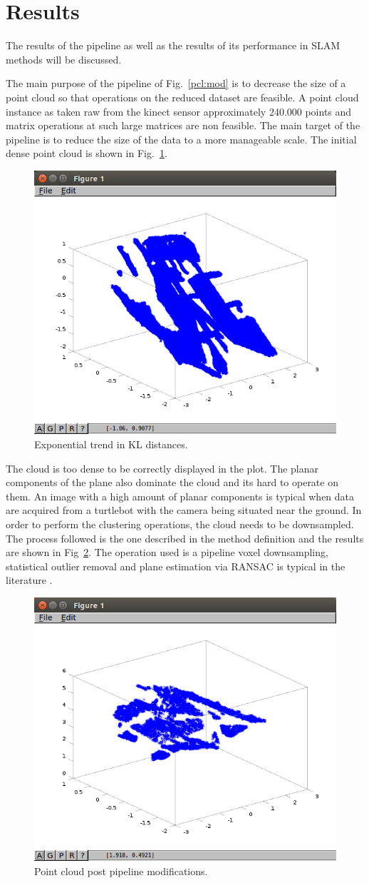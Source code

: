 \documentclass[twoside,hidelinks]{article}
\begin{document}
\section{Results}
\label{sec:results}

The results of the pipeline as well as the results of its performance in SLAM methods will be discussed.

The main purpose of the pipeline of Fig.~\ref{pcl:mod} is to decrease the size of a point cloud so that operations on the reduced dataset are feasible. A point cloud instance as taken raw from the kinect sensor approximately 240.000 points and matrix operations at such large matrices are non feasible. The main target of the pipeline is to reduce the size of the data to a more manageable scale. The initial dense point cloud is shown in Fig.~\ref{pcl:fig}.

\begin{figure}[h!]
  \centering
    \includegraphics[width=.5\textwidth]{denseInitial}
    \caption{Exponential trend in KL distances.}
  \label{pcl:fig}
\end{figure}

The cloud is too dense to be correctly displayed in the plot. The planar components of the plane also dominate the cloud and its hard to operate on them. An image with a high amount of planar components is typical when data are acquired from a turtlebot with the camera being situated near the ground. In order to perform the clustering operations, the cloud needs to be downsampled. The process followed is the one described in the method definition and the results are shown in Fig~\ref{pcl:reduced}. The operation used is a pipeline voxel downsampling, statistical outlier removal and plane estimation via RANSAC is typical in the literature \cite{objectDisc}.


\begin{figure}[h!]
  \centering
    \includegraphics[width=.5\textwidth]{initial}
    \caption{Point cloud post pipeline modifications.}
  \label{pcl:reduced}
\end{figure}
\end{document}
